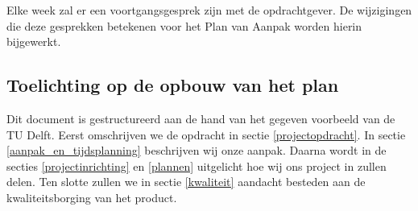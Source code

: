 Elke week zal er een voortgangsgesprek zijn met de opdrachtgever.
De wijzigingen die deze gesprekken betekenen voor het Plan van Aanpak worden hierin bijgewerkt.

\subsection{Toelichting op de opbouw van het plan}

Dit document is gestructureerd aan de hand van het gegeven voorbeeld van de TU Delft.
Eerst omschrijven we de opdracht in sectie \ref{projectopdracht}.
In sectie \ref{aanpak_en_tijdsplanning} beschrijven wij onze aanpak.
Daarna wordt in de secties \ref{projectinrichting} en \ref{plannen} uitgelicht hoe wij ons project in zullen delen.
Ten slotte zullen we in sectie \ref{kwaliteit} aandacht besteden aan de kwaliteitsborging van het product.
